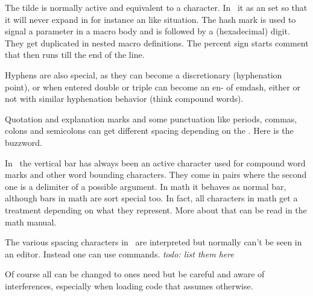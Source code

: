 The tilde is normally active and equivalent to a \type {\nbsp} character. In
\CONTEXT\ it as an \type {\amcode} set so that it will never expand in for
instance an \type {\edef} like situation. The hash mark is used to signal a
parameter in a macro body and is followed by a (hexadecimal) digit. They get
duplicated in nested macro definitions. The percent sign starts comment that then
runs till the end of the line.

Hyphens are also special, as they can become a discretionary (hyphenation point),
or when entered double or triple can become an en- of emdash, either or not with
similar hyphenation behavior (think compound words).

Quotation and explanation marks and some punctuation like periods, commas, colons
and semicolons can get different spacing depending on the \type {\sfcode}. Here
 is the buzzword.

In \CONTEXT\ the vertical bar has always been an active character used for
compound word marks and other word bounding characters. They come in pairs where
the second one is a delimiter of a possible argument. In math it behaves as
normal bar, although bars in math are sort special too. In fact, all characters
in math get a treatment depending on what they represent. More about that
can be read in the math manual.

The various spacing characters in \UNICODE\ are interpreted but normally can't be
seen in an editor. Instead one can use commands. {\em todo: list them here}

Of course all can be changed to ones need but be careful and aware of interferences,
especially when loading code that assumes otherwise.

\stopsectionlevel

\stopdocument

%
%
%
%

